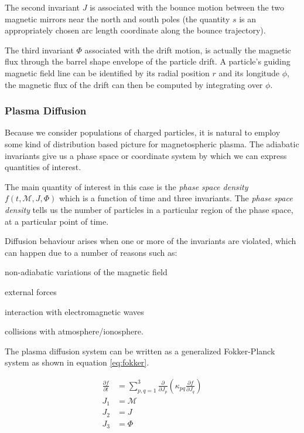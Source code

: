 The second invariant $J$ is associated with the bounce motion between the two magnetic mirrors near the north and 
south poles (the quantity $s$ is an appropriately chosen arc length coordinate along the bounce trajectory). 

The third invariant $\Phi$ associated with the drift motion, is actually the magnetic flux through the barrel 
shape envelope of the particle drift. A particle's guiding magnetic field line can be identified by its radial 
position $r$ and its longitude $\phi$, the magnetic flux of the drift can then be computed by integrating over 
$\phi$.

\subsubsection*{Plasma Diffusion}

Because we consider populations of charged particles, it is natural to employ some kind of distribution based 
picture for magnetospheric plasma. The adiabatic invariants give us a phase space or coordinate system by which 
we can express quantities of interest. 

The main quantity of interest in this case is the \emph{phase space density} $f(t, \mathcal{M}, J, \Phi)$ which 
is a function of time and three invariants. The \emph{phase space density} tells us the number of particles in 
a particular region of the phase space, at a particular point of time.

Diffusion behaviour arises when one or more of the invariants are violated, which can happen due to a number of 
reasons such as: 
\begin{enumerate*}
    \item non-adiabatic variations of the magnetic field 
    \item external forces
    \item interaction with electromagnetic waves
    \item collisions with atmosphere/ionosphere. 
\end{enumerate*}

The plasma diffusion system \citep{schulz2012particle} can be written as a generalized Fokker-Planck system as shown 
in equation \ref{eq:fokker}.

\begin{align}\label{eq:fokker}
    \frac{\partial{f}}{\partial{t}} &= \sum^{3}_{p,q = 1}
    \frac{\partial}{\partial{J_{p}}} \left( \kappa_{pq}
    \frac{\partial{f}}{\partial{J_{q}}} \right) \\
    J_1 &= \mathcal{M} \\
    J_2 &= J \\
    J_{3} &= \Phi
\end{align}

